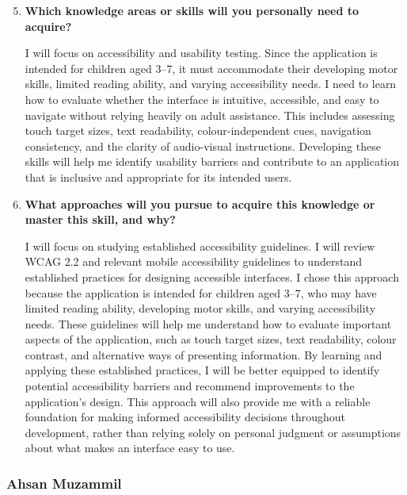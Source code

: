 \documentclass[10pt]{article}
\begin{document}
\begin{enumerate}
    \setcounter{enumi}{4}

    \item \textbf{Which knowledge areas or skills will you personally
    need to acquire?}

    I will focus on accessibility and usability testing. Since the
    application is intended for children aged 3--7, it must accommodate
    their developing motor skills, limited reading ability, and varying
    accessibility needs. I need to learn how to evaluate whether the
    interface is intuitive, accessible, and easy to navigate without
    relying heavily on adult assistance. This includes assessing
    touch target sizes, text readability, colour-independent cues,
    navigation consistency, and the clarity of audio-visual instructions.
    Developing these skills will help me identify usability barriers
    and contribute to an application that is inclusive and appropriate
    for its intended users.

    \item \textbf{What approaches will you pursue to acquire this
    knowledge or master this skill, and why?}

    I will focus on studying established accessibility guidelines.
    I will review WCAG 2.2 and relevant mobile accessibility guidelines
    to understand established practices for designing accessible interfaces.
    I chose this approach because the application is intended for children
    aged 3–7, who may have limited reading ability, developing motor skills,
    and varying accessibility needs. These guidelines will help me understand
    how to evaluate important aspects of the application, such as touch
    target sizes, text readability, colour contrast, and alternative ways
    of presenting information. By learning and applying these established
    practices, I will be better equipped to identify potential accessibility
    barriers and recommend improvements to the application's design.
    This approach will also provide me with a reliable foundation for
    making informed accessibility decisions throughout development,
    rather than relying solely on personal judgment or assumptions about
    what makes an interface easy to use.

\end{enumerate}

\subsubsection*{Ahsan Muzammil}
\end{document}
